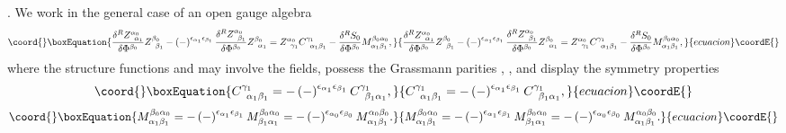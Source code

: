 \documentclass[a4paper,12pt]{article}
\begin{document}
. We work in the general case of an open gauge algebra 
\begin{equation}\coord{}\boxEquation{
\frac{\delta ^{R}Z_{\;\;\alpha _{1}}^{\alpha _{0}}}{\delta \Phi ^{\beta _{0}}
}Z_{\;\;\beta _{1}}^{\beta _{0}}-\left( -\right) ^{\epsilon _{\alpha
_{1}}\epsilon _{\beta _{1}}}\frac{\delta ^{R}Z_{\;\;\beta _{1}}^{\alpha _{0}}
}{\delta \Phi ^{\beta _{0}}}Z_{\;\;\alpha _{1}}^{\beta _{0}}=Z_{\;\;\gamma
_{1}}^{\alpha _{0}}C_{\;\;\alpha _{1}\beta _{1}}^{\gamma _{1}}-\frac{\delta
^{R}S_{0}}{\delta \Phi ^{\beta _{0}}}M_{\alpha _{1}\beta _{1}}^{\beta
_{0}\alpha _{0}},  \label{sp3.a}
}{
\frac{\delta ^{R}Z_{\;\;\alpha _{1}}^{\alpha _{0}}}{\delta \Phi ^{\beta _{0}}
}Z_{\;\;\beta _{1}}^{\beta _{0}}-\left( -\right) ^{\epsilon _{\alpha
_{1}}\epsilon _{\beta _{1}}}\frac{\delta ^{R}Z_{\;\;\beta _{1}}^{\alpha _{0}}
}{\delta \Phi ^{\beta _{0}}}Z_{\;\;\alpha _{1}}^{\beta _{0}}=Z_{\;\;\gamma
_{1}}^{\alpha _{0}}C_{\;\;\alpha _{1}\beta _{1}}^{\gamma _{1}}-\frac{\delta
^{R}S_{0}}{\delta \Phi ^{\beta _{0}}}M_{\alpha _{1}\beta _{1}}^{\beta
_{0}\alpha _{0}},  }{ecuacion}\coordE{}\end{equation}
where the structure functions \coordHE{}
and \coordHE{} may involve the
fields, possess the Grassmann parities \coordHE{}, \coordHE{}, and display
the symmetry properties 
\begin{equation}\coord{}\boxEquation{
C_{\;\;\alpha _{1}\beta _{1}}^{\gamma _{1}}=-\left( -\right) ^{\epsilon
_{\alpha _{1}}\epsilon _{\beta _{1}}}C_{\;\;\beta _{1}\alpha _{1}}^{\gamma
_{1}},  \label{sp3.b}
}{
C_{\;\;\alpha _{1}\beta _{1}}^{\gamma _{1}}=-\left( -\right) ^{\epsilon
_{\alpha _{1}}\epsilon _{\beta _{1}}}C_{\;\;\beta _{1}\alpha _{1}}^{\gamma
_{1}},  }{ecuacion}\coordE{}\end{equation}
\begin{equation}\coord{}\boxEquation{
M_{\alpha _{1}\beta _{1}}^{\beta _{0}\alpha _{0}}=-\left( -\right)
^{\epsilon _{\alpha _{1}}\epsilon _{\beta _{1}}}M_{\beta _{1}\alpha
_{1}}^{\beta _{0}\alpha _{0}}=-\left( -\right) ^{\epsilon _{\alpha
_{0}}\epsilon _{\beta _{0}}}M_{\alpha _{1}\beta _{1}}^{\alpha _{0}\beta
_{0}}.  \label{sp3.c}
}{
M_{\alpha _{1}\beta _{1}}^{\beta _{0}\alpha _{0}}=-\left( -\right)
^{\epsilon _{\alpha _{1}}\epsilon _{\beta _{1}}}M_{\beta _{1}\alpha
_{1}}^{\beta _{0}\alpha _{0}}=-\left( -\right) ^{\epsilon _{\alpha
_{0}}\epsilon _{\beta _{0}}}M_{\alpha _{1}\beta _{1}}^{\alpha _{0}\beta
_{0}}.  }{ecuacion}\coordE{}\end{equation}
\end{document}

